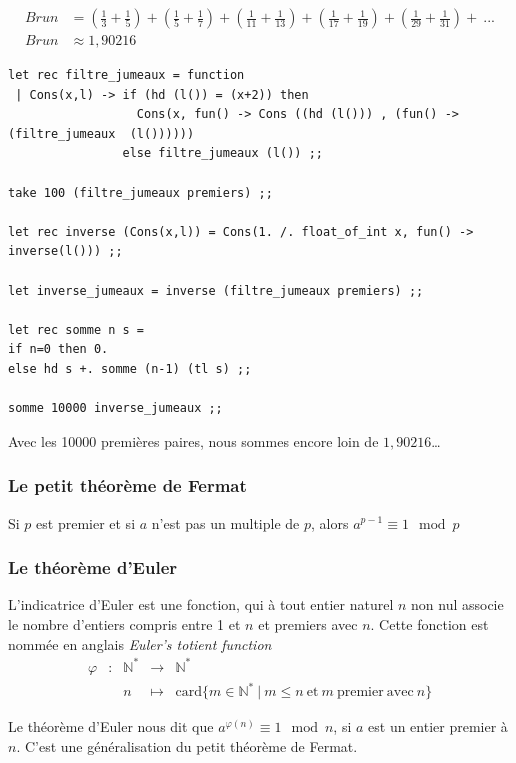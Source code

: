 \begin{align*}
   Brun &= (\frac{1}{3} + \frac{1}{5}) + (\frac{1}{5} + \frac{1}{7}) + (\frac{1}{11} + \frac{1}{13}) + (\frac{1}{17} + \frac{1}{19}) + (\frac{1}{29} + \frac{1}{31}) +\  ...  \\
   Brun &\approx 1,90216
\end{align*}


\begin{verbatim}
let rec filtre_jumeaux = function
 | Cons(x,l) -> if (hd (l()) = (x+2)) then 
                  Cons(x, fun() -> Cons ((hd (l())) , (fun() ->  (filtre_jumeaux  (l())))))
                else filtre_jumeaux (l()) ;;

take 100 (filtre_jumeaux premiers) ;;

let rec inverse (Cons(x,l)) = Cons(1. /. float_of_int x, fun() -> inverse(l())) ;;

let inverse_jumeaux = inverse (filtre_jumeaux premiers) ;;

let rec somme n s =
if n=0 then 0.
else hd s +. somme (n-1) (tl s) ;;

somme 10000 inverse_jumeaux ;;
 \end{verbatim}
 Avec les 10000 premières paires, nous sommes encore loin de $1,90216$\dots

\subsubsection{Le petit théorème de Fermat}
Si $p$ est premier et si $a$ n’est pas un multiple de $p$, alors $a^{p-1}\equiv 1  \mod p$

\subsubsection{Le théorème d'Euler}
L'indicatrice d'Euler est une fonction, qui à tout entier naturel $n$ non nul associe
 le nombre d'entiers compris entre 1 et $n$ et premiers avec $n$. Cette fonction est nommée en anglais
 \textit{Euler's totient function}
$$
\begin{array}{ccccl}
  \varphi & : & \mathbb{N}^* & \longrightarrow & \mathbb{N}^* \\
   & & n& \longmapsto &\mathrm{card}\{ m \in \mathbb{N}^* ~|~m\le n~  \text{et}~m~\mathrm{premier~avec}~n \}
\end{array}
$$


Le théorème d'Euler nous dit que $ a^{\varphi (n)} \equiv 1 \mod n $, si $a$ est un entier premier à $n$.
C'est une généralisation du petit théorème de Fermat.

